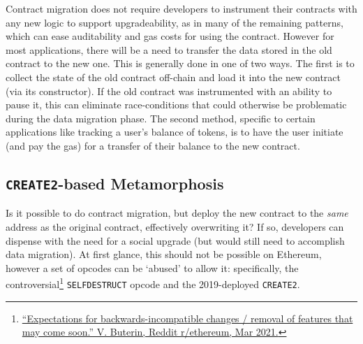 Contract migration does not require developers to instrument their contracts with any new logic to support upgradeability, as in many of the remaining patterns, which can ease auditability and gas costs for using the contract. However for most applications, there will be a need to transfer the data stored in the old contract to the new one. This is generally done in one of two ways. The first is to collect the state of the old contract off-chain and load it into the new contract (\eg via its constructor). If the old contract was instrumented with an ability to pause it, this can eliminate race-conditions that could otherwise be problematic during the data migration phase. The second method, specific to certain applications like tracking a user's balance of tokens, is to have the user initiate (and pay the gas) for a transfer of their balance to the new contract.
 
 

\subsection{\texttt{CREATE2}-based Metamorphosis}
\label{sec:metamorphic}

Is it possible to do contract migration, but deploy the new contract to the \textit{same} address as the original contract, effectively overwriting it? If so, developers can dispense with the need for a social upgrade (but would still need to accomplish data migration). At first glance, this should not be possible on Ethereum, however a set of opcodes can be `abused' to allow it: specifically, the controversial\footnote{\href{https://www.reddit.com/r/ethereum/comments/lx32kv/expectations\_for\_backwardsincompatible\_changes/}{``Expectations for backwards-incompatible changes / removal of features that may come soon.'' V. Buterin, Reddit r/ethereum, Mar 2021.}} \texttt{SELFDESTRUCT} opcode and the 2019-deployed \texttt{CREATE2}. 


